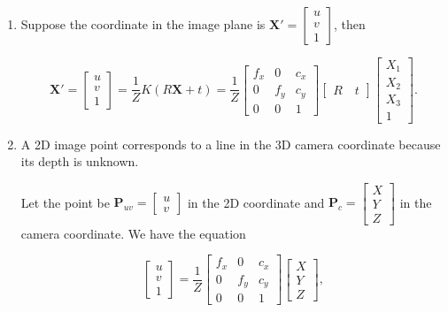 \documentclass{article}
\begin{document}
\begin{enumerate}
\item Suppose the coordinate in the image plane is $\boldsymbol X' = \begin{bmatrix} u \\ v \\ 1 \end{bmatrix}$, then

$$
\boldsymbol X' = \begin{bmatrix} u \\ v \\ 1 \end{bmatrix} = \frac 1Z K(R\boldsymbol X + t) = \frac 1Z \begin{bmatrix} f_x & 0 & c_x \\ 0 & f_y & c_y \\ 0 & 0 & 1 \end{bmatrix} \begin{bmatrix} R \quad t \end{bmatrix} \begin{bmatrix} X_1 \\ X_2 \\ X_3 \\ 1 \end{bmatrix}.
$$

\item A 2D image point corresponds to a line in the 3D camera coordinate because its depth is unknown. 

Let the point be $\boldsymbol P_{uv} = \begin{bmatrix} u \\ v \end{bmatrix}$ in the 2D coordinate and $\boldsymbol P_c = \begin{bmatrix} X \\ Y \\ Z \end{bmatrix}$ in the camera coordinate. We have 
the equation

$$
\begin{bmatrix} u \\ v \\ 1 \end{bmatrix} = \frac 1Z \begin{bmatrix} f_x & 0 & c_x \\ 0 & f_y & c_y \\ 0 & 0 & 1 \end{bmatrix} \begin{bmatrix} X \\ Y \\ Z \end{bmatrix},
$$


\end{enumerate}
\end{document}
